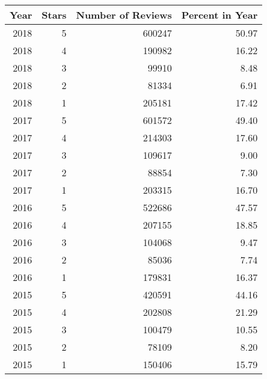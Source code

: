 \begin{tabular}{rrrr}
\toprule
 Year &  Stars &  Number of Reviews &  Percent in Year \\
\midrule
 2018 &      5 &             600247 &            50.97 \\
 2018 &      4 &             190982 &            16.22 \\
 2018 &      3 &              99910 &             8.48 \\
 2018 &      2 &              81334 &             6.91 \\
 2018 &      1 &             205181 &            17.42 \\
 2017 &      5 &             601572 &            49.40 \\
 2017 &      4 &             214303 &            17.60 \\
 2017 &      3 &             109617 &             9.00 \\
 2017 &      2 &              88854 &             7.30 \\
 2017 &      1 &             203315 &            16.70 \\
 2016 &      5 &             522686 &            47.57 \\
 2016 &      4 &             207155 &            18.85 \\
 2016 &      3 &             104068 &             9.47 \\
 2016 &      2 &              85036 &             7.74 \\
 2016 &      1 &             179831 &            16.37 \\
 2015 &      5 &             420591 &            44.16 \\
 2015 &      4 &             202808 &            21.29 \\
 2015 &      3 &             100479 &            10.55 \\
 2015 &      2 &              78109 &             8.20 \\
 2015 &      1 &             150406 &            15.79 \\
\bottomrule
\end{tabular}
